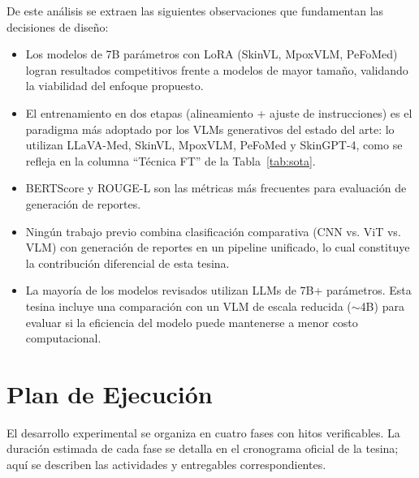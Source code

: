 \documentclass[11pt, a4paper]{article}
\begin{document}

De este análisis se extraen las siguientes observaciones que fundamentan las decisiones de diseño:
\begin{itemize}
    \item Los modelos de 7B parámetros con LoRA (SkinVL, MpoxVLM, PeFoMed) logran resultados competitivos frente a modelos de mayor tamaño, validando la viabilidad del enfoque propuesto.
    \item El entrenamiento en dos etapas (alineamiento + ajuste de instrucciones) es el paradigma más adoptado por los VLMs generativos del estado del arte: lo utilizan LLaVA-Med, SkinVL, MpoxVLM, PeFoMed y SkinGPT-4, como se refleja en la columna ``Técnica FT'' de la Tabla~\ref{tab:sota}.
    \item BERTScore y ROUGE-L son las métricas más frecuentes para evaluación de generación de reportes.
    \item Ningún trabajo previo combina clasificación comparativa (CNN vs. ViT vs. VLM) con generación de reportes en un pipeline unificado, lo cual constituye la contribución diferencial de esta tesina.
    \item La mayoría de los modelos revisados utilizan LLMs de 7B+ parámetros. Esta tesina incluye una comparación con un VLM de escala reducida ($\sim$4B) para evaluar si la eficiencia del modelo puede mantenerse a menor costo computacional.
\end{itemize}

\section{Plan de Ejecución}

El desarrollo experimental se organiza en cuatro fases con hitos verificables. La duración estimada de cada fase se detalla en el cronograma oficial de la tesina; aquí se describen las actividades y entregables correspondientes.
\end{document}
